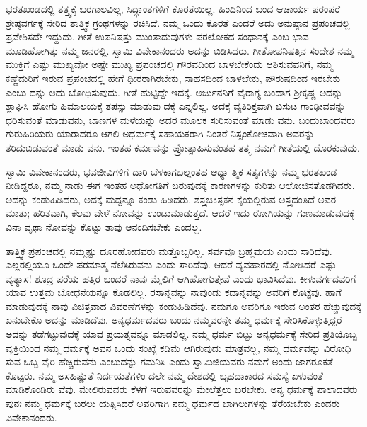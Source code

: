 ಭರತಖಂಡದಲ್ಲಿ ತತ್ತ್ವಕ್ಕೆ ಬರಗಾಲವಿಲ್ಲ, ಸಿದ್ಧಾಂತಗಳಿಗೆ ಕೊರತೆಯಿಲ್ಲ. ಹಿಂದಿನಿಂದ ಬಂದ ಆಚಾರ್ಯ ಪರಂಪರೆ ಶ್ರೇಷ್ಠವರ್ಗಕ್ಕೆ ಸೇರಿದ ತಾತ್ತ್ವಿಕ ಗ್ರಂಥಗಳನ್ನು ರಚಿಸಿದೆ. ನಮ್ಮ ಒಂದು ಕೊರತೆ ಎಂದರೆ ಅದು ಅನುಷ್ಠಾನ ಪ್ರಪಂಚದಲ್ಲಿ ಪ್ರವೇಶಿಸದೇ ಇದ್ದುದು. ಗೀತೆ ಉಪನಿಷತ್ತು ಮುಂತಾದುವುಗಳು ಪರಲೋಕದ ಸಂಧಾನಕ್ಕೆ ಎಂಬ ಭಾವ ಮೂಡಿಹೋಗಿತ್ತು ನಮ್ಮ ಜನರಲ್ಲಿ. ಸ್ವಾಮಿ ವಿವೇಕಾನಂದರು ಅದನ್ನು ಬಿಡಿಸಿದರು. ಗೀತೋಪನಿಷತ್ತಿನ ಸಂದೇಶ ನಮ್ಮ ಮುಕ್ತಿಗೆ ಎಷ್ಟು ಮುಖ್ಯವೋ ಅಷ್ಟೇ ಮುಖ್ಯ ಪ್ರಪಂಚದಲ್ಲಿ ಗೌರವದಿಂದ ಬಾಳಬೇಕೆಂದು ಆಶಿಸುವವನಿಗೆ, ನಮ್ಮ ಕಣ್ಣೆದುರಿಗೆ ಇರುವ ಪ್ರಪಂಚದಲ್ಲಿ ಹೇಗೆ ಧೀರರಾಗಿರಬೇಕು, ಸಾಹಸದಿಂದ ಬಾಳಬೇಕು, ಪೌರುಷದಿಂದ ಇರಬೇಕು ಎಂಬು ದನ್ನು ಅದು ಬೋಧಿಸುವುದು. ಗೀತೆ ಹುಟ್ಟಿದ್ದೇ ಇದಕ್ಕೆ. ಅರ್ಜುನನಿಗೆ ವೈರಾಗ್ಯ ಬಂದಾಗ ಶ್ರೀಕೃಷ್ಣ ಅದನ್ನು ಶ್ಲಾಘಿಸಿ ಹೋಗು ಹಿಮಾಲಯಕ್ಕೆ ತಪಸ್ಸು ಮಾಡುವು ದಕ್ಕೆ ಎನ್ನಲಿಲ್ಲ. ಅದಕ್ಕೆ ವ್ಯತಿರಿಕ್ತವಾಗಿ ಬಿಸುಟ ಗಾಂಢೀವವನ್ನು ಧರಿಸುವಂತೆ ಮಾಡುವನು, ಬಾಣಗಳ ಮಳೆಯನ್ನು ಅದರ ಮೂಲಕ ಸುರಿಸುವಂತೆ ಮಾಡು ವನು. ಬಂಧುಬಾಂಧವರು ಗುರುಹಿರಿಯರು ಯಾರಾದರೂ ಆಗಲಿ ಅಧರ್ಮಕ್ಕೆ ಸಹಾಯಕರಾಗಿ ನಿಂತರೆ ನಿಸ್ಸಂಕೋಚವಾಗಿ ಅವರನ್ನು ತರಿದುಬಿಡುವಂತೆ ಮಾಡು ವನು. ಇಂತಹ ಕರ್ಮವನ್ನು ಪ್ರೋತ್ಸಾಹಿಸುವಂತಹ ತತ್ತ್ವ ನಮಗೆ ಗೀತೆಯಲ್ಲಿ ದೊರಕುವುದು.

ಸ್ವಾಮಿ ವಿವೇಕಾನಂದರು, ಭವಜೀವಿಗಳಿಗೆ ದಾರಿ ಬೆಳಕಾಗಬಲ್ಲಂತಹ ಆಧ್ಯಾ ತ್ಮಿಕ ಸತ್ಯಗಳನ್ನು ನಮ್ಮ ಭರತಖಂಡ ನೀಡಿದ್ದರೂ, ನಮ್ಮ ನಾಡು ಈಗ ಇಂತಹ ಅಧೋಗತಿಗೆ ಬರುವುದಕ್ಕೆ ಕಾರಣಗಳನ್ನು ಕುರಿತು ಆಲೋಚಿಸತೊಡಗಿದರು. ಅದನ್ನು ಕಂಡುಹಿಡಿದರು, ಅದಕ್ಕೆ ಮದ್ದನ್ನೂ ಕಂಡು ಹಿಡಿದರು. ಶಸ್ತ್ರಚಿಕಿತ್ಸಕನ ಕೈಯಲ್ಲಿರುವ ಅಸ್ತ್ರದಂತಿದೆ ಅವರ ಮಾತು; ಹರಿತವಾಗಿ, ಕೆಲವು ವೇಳೆ ನೋವನ್ನು ಉಂಟುಮಾಡುತ್ತದೆ. ಆದರೆ ಇದು ರೋಗಿಯನ್ನು ಗುಣಮಾಡುವುದಕ್ಕೆ ವಿನಾ ವೃಥಾ ನೋವನ್ನು ಕೊಟ್ಟು ತಾವು ಆನಂದಿಸಬೇಕು ಎಂದಲ್ಲ.

ತಾತ್ತ್ವಿಕ ಪ್ರಪಂಚದಲ್ಲಿ ನಮ್ಮಷ್ಟು ದೂರಹೋದವರು ಮತ್ತೊಬ್ಬರಿಲ್ಲ. ಸರ್ವವೂ ಬ್ರಹ್ಮಮಯ ಎಂದು ಸಾರಿದೆವು. ಎಲ್ಲರಲ್ಲಿಯೂ ಒಂದೇ ಪರಮಾತ್ಮ ನೆಲೆಸಿರುವನು ಎಂದು ಸಾರಿದೆವು. ಆದರೆ ವ್ಯವಹಾರದಲ್ಲಿ ನೋಡಿದರೆ ಎಷ್ಟು ವ್ಯತ್ಯಾಸ! ಶೂದ್ರ ಪರೆಯ ಹತ್ತಿರ ಬಂದರೆ ನಾವು ಮೈಲಿಗೆ ಆಗಿಹೋಗುತ್ತೇವೆ ಎಂದು ಭಾವಿಸಿದೆವು. ಕೀಳುವರ್ಗದವರಿಗೆ ಯಾವ ಉತ್ತಮ ಬೋಧನೆಯನ್ನೂ ಕೊಡಲಿಲ್ಲ. ರಸಾನ್ನವನ್ನು ನಾವುಂಡು ಕದಾನ್ನವನ್ನು ಅವರಿಗೆ ಕೊಟ್ಟೆವು. ಹಾಗೆ ಮಾಡುವುದಕ್ಕೆ ನಾವು ವಿಚಿತ್ರವಾದ ವಿವರಣೆಗಳನ್ನು ಕಂಡುಹಿಡಿದೆವು. ನಮಗೂ ಅವರಿಗೂ ಇರುವ ಅಂತರ ಹೆಚ್ಚುವುದಕ್ಕೆ ಏನುಬೇಕೊ ಅದನ್ನು ಮಾಡಿದೆವು. ಅನ್ಯಧರ್ಮದವರು ಬಂದು ನಮ್ಮವರನ್ನೇ ತಮ್ಮ ಧರ್ಮಕ್ಕೆ ಸೇರಿಸಿಕೊಳ್ಳುತ್ತಿದ್ದರೆ ಅದನ್ನು ತಡೆಗಟ್ಟುವುದಕ್ಕೆ ಯಾವ ಪ್ರಯತ್ನವನ್ನೂ ಮಾಡಲಿಲ್ಲ. ನಮ್ಮ ಧರ್ಮ ಬಿಟ್ಟು ಅನ್ಯಧರ್ಮಕ್ಕೆ ಸೇರಿದ ಪ್ರತಿಯೊಬ್ಬ ವ್ಯಕ್ತಿಯಿಂದ ನಮ್ಮ ಧರ್ಮಕ್ಕೆ ಅವನ ಒಂದು ಸಂಖ್ಯೆ ಕಡಿಮೆ ಆಗಿರುವುದು ಮಾತ್ರವಲ್ಲ, ನಮ್ಮ ಧರ್ಮವನ್ನು ವಿರೋಧಿ ಸುವ ಒಬ್ಬ ವೈರಿ ಹೆಚ್ಚಿರುವನು ಎಂಬುದನ್ನು ಗಮನಿಸಿ ಎಂದು ಸ್ವಾಮಿಜಿಯವರು ನಮಗೆ ಅಂದು ಜಾಗರೂಕತೆ ಕೊಟ್ಟರು. ನಮ್ಮ ಅಸಹಿಷ್ಣುತೆ ನಿರ್ದಯತೆಗಳಿಂ ದಲೇ ನಮ್ಮ ದೇಶದಲ್ಲಿ ಬೃಹದಾಕಾರದ ಸಮಸ್ಯೆ ಏಳುವಂತೆ ಮಾಡಿಕೊಂಡಿರು ವೆವು. ಮೇಲಿರುವವರು ಕೆಳಗೆ ಇರುವವರನ್ನು ಮೇಲೆತ್ತಲು ಬರಬೇಕು. ಅನ್ಯ ಧರ್ಮಕ್ಕೆ ಪಾಲಾದವರು ಪುನಃ ನಮ್ಮ ಧರ್ಮಕ್ಕೆ ಬರಲು ಯತ್ನಿಸಿದರೆ ಅವರಿಗಾಗಿ ನಮ್ಮ ಧರ್ಮದ ಬಾಗಿಲುಗಳನ್ನು ತೆರೆಯಬೇಕು ಎಂದರು ವಿವೇಕಾನಂದರು.

